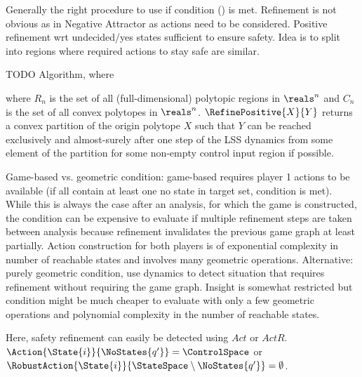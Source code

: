     Generally the right procedure to use if condition () is met.
    Refinement is not obvious as in Negative Attractor as actions need to be considered.
    Positive refinement wrt undecided/yes states sufficient to ensure safety.
    Idea is to split into regions where required actions to stay safe are similar.

    TODO Algorithm, where

    \startformula
         \EndComma
    \stopformula

    where $R_n$ is the set of all (full-dimensional) polytopic regions in $\reals^n$ and $C_n$ is the set of all convex polytopes in $\reals^n$.
    $\RefinePositive{X}{Y}$ returns a convex partition of the origin polytope $X$ such that $Y$ can be reached exclusively and almost-surely after one step of the LSS dynamics from some element of the partition for some non-empty control input region if possible.

    Game-based vs. geometric condition: game-based requires player 1 actions to be available (if all contain at least one no state in target set, condition is met).
    While this is always the case after an analysis, for which the game is constructed, the condition can be expensive to evaluate if multiple refinement steps are taken between analysis because refinement invalidates the previous game graph at least partially.
    Action construction for both players is of exponential complexity in number of reachable states and involves many geometric operations.
    Alternative: purely geometric condition, use dynamics to detect situation that requires refinement without requiring the game graph.
    Insight is somewhat restricted but condition might be much cheaper to evaluate with only a few geometric operations and polynomial complexity in the number of reachable states.

    Here, safety refinement can easily be detected using $Act$ or $ActR$.
    $\Action{\State{i}}{\NoStates{q'}} = \ControlSpace$ or $\RobustAction{\State{i}}{\StateSpace \setminus \NoStates{q'}} = \emptyset$.

\stopsubsection


    \startalgorithmic[numbering=no,margin=0em]
    \stopalgorithmic
    \startalgorithmic
        \ELSE
        \ENDIF
    \stopalgorithmic
\stopbuffer

